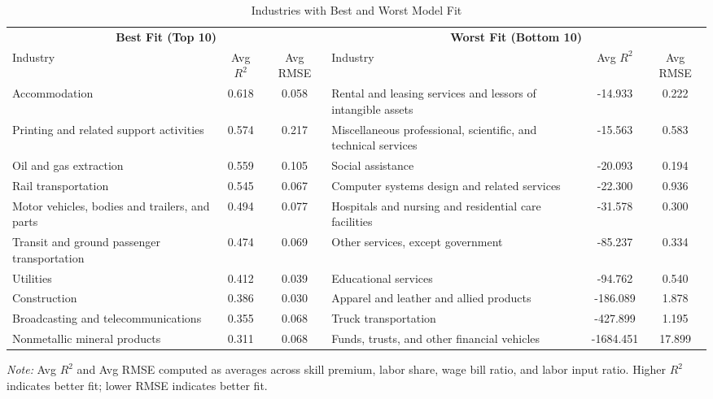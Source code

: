 \begin{table}[H]
\caption{Industries with Best and Worst Model Fit}
\label{tab:best_worst_fit}
\begin{center}
\small
\begin{tabular}{lcc|lcc}
\toprule
\multicolumn{3}{c}{\textbf{Best Fit (Top 10)}} & \multicolumn{3}{c}{\textbf{Worst Fit (Bottom 10)}} \\
\cmidrule(lr){1-3} \cmidrule(lr){4-6}
Industry & Avg $R^2$ & Avg RMSE & Industry & Avg $R^2$ & Avg RMSE \\
\midrule
Accommodation & 0.618 & 0.058 & Rental and leasing services and lessors of intangible assets & -14.933 & 0.222 \\
Printing and related support activities & 0.574 & 0.217 & Miscellaneous professional, scientific, and technical services & -15.563 & 0.583 \\
Oil and gas extraction & 0.559 & 0.105 & Social assistance & -20.093 & 0.194 \\
Rail transportation & 0.545 & 0.067 & Computer systems design and related services & -22.300 & 0.936 \\
Motor vehicles, bodies and trailers, and parts & 0.494 & 0.077 & Hospitals and nursing and residential care facilities & -31.578 & 0.300 \\
Transit and ground passenger transportation & 0.474 & 0.069 & Other services, except government & -85.237 & 0.334 \\
Utilities & 0.412 & 0.039 & Educational services & -94.762 & 0.540 \\
Construction & 0.386 & 0.030 & Apparel and leather and allied products & -186.089 & 1.878 \\
Broadcasting and telecommunications & 0.355 & 0.068 & Truck transportation & -427.899 & 1.195 \\
Nonmetallic mineral products & 0.311 & 0.068 & Funds, trusts, and other financial vehicles & -1684.451 & 17.899 \\
\bottomrule
\end{tabular}
\end{center}
\begin{minipage}{\textwidth}
\small
\textit{Note:} Avg $R^2$ and Avg RMSE computed as averages across skill premium, labor share, wage bill ratio, and labor input ratio. 
Higher $R^2$ indicates better fit; lower RMSE indicates better fit.
\end{minipage}
\end{table}
